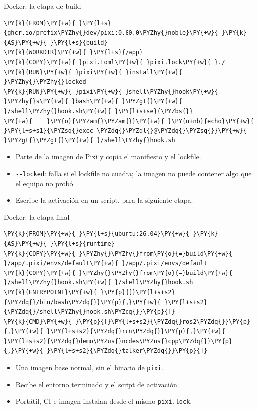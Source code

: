 \documentclass[aspectratio=169]{beamer}
\begin{document}
\begin{frame}[fragile]{Docker: la etapa de build}
\begin{filelisting}
\begin{Verbatim}[commandchars=\\\{\},breaklines,breakanywhere]
\PY{k}{FROM}\PY{+w}{ }\PY{l+s}{ghcr.io/prefix\PYZhy{}dev/pixi:0.80.0\PYZhy{}noble}\PY{+w}{ }\PY{k}{AS}\PY{+w}{ }\PY{l+s}{build}
\PY{k}{WORKDIR}\PY{+w}{ }\PY{l+s}{/app}
\PY{k}{COPY}\PY{+w}{ }pixi.toml\PY{+w}{ }pixi.lock\PY{+w}{ }./
\PY{k}{RUN}\PY{+w}{ }pixi\PY{+w}{ }install\PY{+w}{ }\PYZhy{}\PYZhy{}locked
\PY{k}{RUN}\PY{+w}{ }pixi\PY{+w}{ }shell\PYZhy{}hook\PY{+w}{ }\PYZhy{}s\PY{+w}{ }bash\PY{+w}{ }\PYZgt{}\PY{+w}{ }/shell\PYZhy{}hook.sh\PY{+w}{ }\PY{l+s+se}{\PYZbs{}}
\PY{+w}{    }\PY{o}{\PYZam{}\PYZam{}}\PY{+w}{ }\PY{n+nb}{echo}\PY{+w}{ }\PY{l+s+s1}{\PYZsq{}exec \PYZdq{}\PYZdl{}@\PYZdq{}\PYZsq{}}\PY{+w}{ }\PYZgt{}\PYZgt{}\PY{+w}{ }/shell\PYZhy{}hook.sh
\end{Verbatim}
\end{filelisting}
\vfill
\begin{itemize}
    \item Parte de la imagen de Pixi y copia el manifiesto y el lockfile.
    \item \lstinline|--locked|: falla si el lockfile no cuadra; la imagen no puede contener algo que el equipo no probó.
    \item Escribe la activación en un script, para la siguiente etapa.
\end{itemize}
\end{frame}

\begin{frame}[fragile]{Docker: la etapa final}
\begin{filelisting}
\begin{Verbatim}[commandchars=\\\{\},breaklines,breakanywhere]
\PY{k}{FROM}\PY{+w}{ }\PY{l+s}{ubuntu:26.04}\PY{+w}{ }\PY{k}{AS}\PY{+w}{ }\PY{l+s}{runtime}
\PY{k}{COPY}\PY{+w}{ }\PYZhy{}\PYZhy{}from\PY{o}{=}build\PY{+w}{ }/app/.pixi/envs/default\PY{+w}{ }/app/.pixi/envs/default
\PY{k}{COPY}\PY{+w}{ }\PYZhy{}\PYZhy{}from\PY{o}{=}build\PY{+w}{ }/shell\PYZhy{}hook.sh\PY{+w}{ }/shell\PYZhy{}hook.sh
\PY{k}{ENTRYPOINT}\PY{+w}{ }\PY{p}{[}\PY{l+s+s2}{\PYZdq{}/bin/bash\PYZdq{}}\PY{p}{,}\PY{+w}{ }\PY{l+s+s2}{\PYZdq{}/shell\PYZhy{}hook.sh\PYZdq{}}\PY{p}{]}
\PY{k}{CMD}\PY{+w}{ }\PY{p}{[}\PY{l+s+s2}{\PYZdq{}ros2\PYZdq{}}\PY{p}{,}\PY{+w}{ }\PY{l+s+s2}{\PYZdq{}run\PYZdq{}}\PY{p}{,}\PY{+w}{ }\PY{l+s+s2}{\PYZdq{}demo\PYZus{}nodes\PYZus{}cpp\PYZdq{}}\PY{p}{,}\PY{+w}{ }\PY{l+s+s2}{\PYZdq{}talker\PYZdq{}}\PY{p}{]}
\end{Verbatim}
\end{filelisting}
\vfill
\begin{itemize}
    \item Una imagen base normal, sin el binario de \texttt{pixi}.
    \item Recibe el entorno terminado y el script de activación.
    \item Portátil, CI e imagen instalan desde el mismo \lstinline|pixi.lock|.
\end{itemize}
\end{frame}
\end{document}
